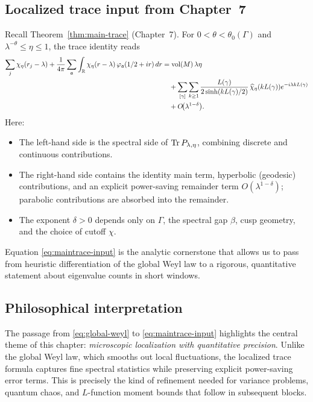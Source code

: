 \subsection{Localized trace input from Chapter~7}

Recall Theorem~\ref{thm:main-trace} (Chapter~7). For $0<\theta<\theta_0(\Gamma)$ and $\lambda^{-\theta}\le \eta\le 1$, the trace identity reads
\begin{align}\label{eq:maintrace-input}
\sum_{j}\chi_\eta(r_j-\lambda)
+\frac{1}{4\pi}\sum_{\mathfrak{a}}
\int_{\mathbb{R}}\chi_\eta(r-\lambda)\,\varphi_{\mathfrak{a}}(1/2+ir)\,dr
&=\operatorname{vol}(M)\,\lambda\eta \\
&\quad+\sum_{[\gamma]}\sum_{k\ge 1}
\frac{L(\gamma)}{2\sinh(kL(\gamma)/2)}\,\widehat{\chi}_\eta(kL(\gamma))e^{-i\lambda kL(\gamma)} \nonumber\\
&\quad+O\!\big(\lambda^{1-\delta}\big). \nonumber
\end{align}
Here:
\begin{itemize}
\item The left-hand side is the spectral side of $\operatorname{Tr} P_{\lambda,\eta}$, combining discrete and continuous contributions.  
\item The right-hand side contains the identity main term, hyperbolic (geodesic) contributions, and an explicit power-saving remainder term $O(\lambda^{1-\delta})$; parabolic contributions are absorbed into the remainder.  
\item The exponent $\delta>0$ depends only on $\Gamma$, the spectral gap $\beta$, cusp geometry, and the choice of cutoff $\chi$.
\end{itemize}

Equation \eqref{eq:maintrace-input} is the analytic cornerstone that allows us to pass from heuristic differentiation of the global Weyl law to a rigorous, quantitative statement about eigenvalue counts in short windows.

\subsection{Philosophical interpretation}

The passage from \eqref{eq:global-weyl} to \eqref{eq:maintrace-input} highlights the central theme of this chapter: \emph{microscopic localization with quantitative precision}. Unlike the global Weyl law, which smooths out local fluctuations, the localized trace formula captures fine spectral statistics while preserving explicit power-saving error terms. This is precisely the kind of refinement needed for variance problems, quantum chaos, and $L$-function moment bounds that follow in subsequent blocks.

